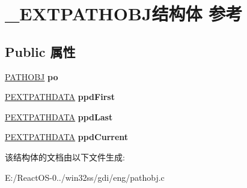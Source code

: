 \hypertarget{struct___e_x_t_p_a_t_h_o_b_j}{}\section{\+\_\+\+E\+X\+T\+P\+A\+T\+H\+O\+B\+J结构体 参考}
\label{struct___e_x_t_p_a_t_h_o_b_j}
\subsection*{Public 属性}
\begin{DoxyCompactItemize}
\item 
\mbox{\label{struct___e_x_t_p_a_t_h_o_b_j_ad214ea0941246e650ac858ef7fcec847}} 
\hyperlink{struct___p_a_t_h_o_b_j}{P\+A\+T\+H\+O\+BJ} {\bfseries po}
\item 
\mbox{\label{struct___e_x_t_p_a_t_h_o_b_j_a173962933bb26f926f401f0a8bf19b82}} 
\hyperlink{struct___e_x_t_p_a_t_h_d_a_t_a}{P\+E\+X\+T\+P\+A\+T\+H\+D\+A\+TA} {\bfseries ppd\+First}
\item 
\mbox{\label{struct___e_x_t_p_a_t_h_o_b_j_a568e1719ee9f3ca08eccb14ac9084dbf}} 
\hyperlink{struct___e_x_t_p_a_t_h_d_a_t_a}{P\+E\+X\+T\+P\+A\+T\+H\+D\+A\+TA} {\bfseries ppd\+Last}
\item 
\mbox{\label{struct___e_x_t_p_a_t_h_o_b_j_a2ded8f9fad774e16c04d6d30bde6174e}} 
\hyperlink{struct___e_x_t_p_a_t_h_d_a_t_a}{P\+E\+X\+T\+P\+A\+T\+H\+D\+A\+TA} {\bfseries ppd\+Current}
\end{DoxyCompactItemize}


该结构体的文档由以下文件生成\+:\begin{DoxyCompactItemize}
\item 
E\+:/\+React\+O\+S-\/0../win32ss/gdi/eng/pathobj.\+c\end{DoxyCompactItemize}
